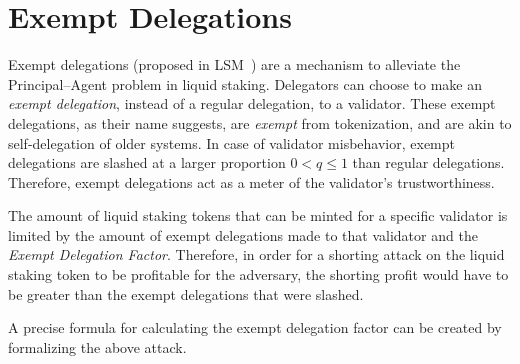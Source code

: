 \section{Exempt Delegations}

Exempt delegations (proposed in LSM~\cite{liquidity-staking-module})
are a mechanism to alleviate
the Principal--Agent problem in liquid staking.
Delegators can choose to make an \emph{exempt delegation},
instead of a regular delegation, to a validator.
These exempt delegations, as their name suggests,
are \emph{exempt} from tokenization,
and are akin to self-delegation of older systems.
In case of validator misbehavior, exempt delegations
are slashed at a larger proportion $0 < q \leq 1$ than regular delegations.
Therefore, exempt delegations act as a meter of the
validator's trustworthiness.


The amount of liquid staking tokens that can be
minted for a specific validator is limited by the amount of
exempt delegations made to that validator and the \emph{Exempt Delegation Factor}.
Therefore, in order for a shorting attack on the liquid staking
token to be profitable for the adversary, the shorting profit would
have to be greater than the exempt delegations that were slashed.

A precise formula for calculating the exempt delegation factor can be
created by formalizing the above attack.
